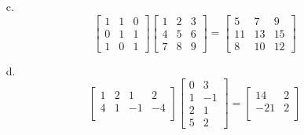 \documentclass[11pt]{article}
\theoremstyle{definition}
\theoremstyle{plain}
\theoremstyle{remark}
\begin{document}
\begin{enumerate}
\begin{enumerate}
              \item[c.]
                    \[
                        \begin{bmatrix}
                            1 & 1 & 0 \\
                            0 & 1 & 1 \\
                            1 & 0 & 1
                        \end{bmatrix}
                        \begin{bmatrix}
                            1 & 2 & 3 \\
                            4 & 5 & 6 \\
                            7 & 8 & 9
                        \end{bmatrix}
                        =
                        \begin{bmatrix}
                            5  & 7  & 9  \\
                            11 & 13 & 15 \\
                            8  & 10 & 12
                        \end{bmatrix}
                    \]

              \item[d.]
                    \[
                        \begin{bmatrix}
                            1 & 2 & 1  & 2  \\
                            4 & 1 & -1 & -4 \\
                        \end{bmatrix}
                        \begin{bmatrix}
                            0 & 3  \\
                            1 & -1 \\
                            2 & 1  \\
                            5 & 2
                        \end{bmatrix}
                        =
                        \begin{bmatrix}
                            14  & 2 \\
                            -21 & 2 \\
                        \end{bmatrix}
                    \]


\end{enumerate}
\end{enumerate}
\end{document}
